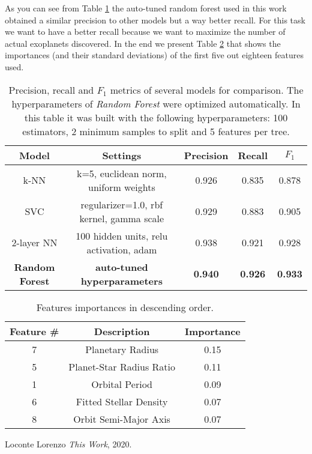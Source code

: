 \documentclass[11pt, a4paper]{article}
\begin{document}
\begin{multicols}{2}
  As you can see from Table \ref{table:benchmark} the auto-tuned random forest used in this work obtained a similar precision to other models but a way better recall. For this task we want to have a better recall because we want to maximize the number of actual exoplanets discovered.
  In the end we present Table \ref{table:importances} that shows the importances (and their standard deviations) of the first five out eighteen features used.
\end{multicols}

  \begin{table}
    \centering
    \begin{tabular}{|c c c c c|}
      \hline
      Model & Settings & Precision & Recall & $F_{1}$  \\
      \hline\hline
      k-NN & k=5, euclidean norm, uniform weights & 0.926 & 0.835 & 0.878 \\
      \hline
      SVC & regularizer=1.0, rbf kernel, gamma scale & 0.929 & 0.883 & 0.905 \\
      \hline
      2-layer NN & 100 hidden units, relu activation, adam & 0.938 & 0.921 & 0.928 \\
      \hline
      \textbf{Random Forest} & \textbf{auto-tuned hyperparameters} & \textbf{0.940} & \textbf{0.926} & \textbf{0.933} \\
      \hline
    \end{tabular}
    \caption{Precision, recall and $F_{1}$ metrics of several models for comparison. The hyperparameters of \textit{Random Forest} were optimized automatically. In this table it was built with the following hyperparameters: 100 estimators, 2 minimum samples to split and 5 features per tree.}
    \label{table:benchmark}
  \end{table}

  \begin{table}
    \centering
    \begin{tabular}{|c c c|}
    \hline
    Feature \# & Description & Importance \\
    \hline\hline
    7 & Planetary Radius & 0.15 \\
    5 & Planet-Star Radius Ratio & 0.11 \\
    1 & Orbital Period & 0.09 \\
    6 & Fitted Stellar Density & 0.07 \\
    8 & Orbit Semi-Major Axis & 0.07 \\
    \hline
    \end{tabular}
    \caption{Features importances in descending order.}
    \label{table:importances}
  \end{table}

\newpage
\begin{thebibliography}{9}
    Loconte Lorenzo
    \textit{This Work}, 2020.
\end{thebibliography}
\end{document}
